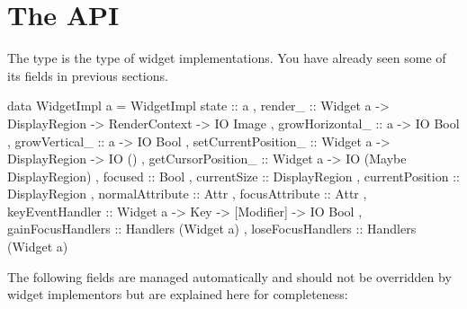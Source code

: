 \section{The  API}

The  type is the type of widget implementations.  You
have already seen some of its fields in previous sections.

\begin{haskellcode}
 data WidgetImpl a = WidgetImpl {
       state :: a
     , render_ :: Widget a -> DisplayRegion -> RenderContext
               -> IO Image
     , growHorizontal_ :: a -> IO Bool
     , growVertical_ :: a -> IO Bool
     , setCurrentPosition_ :: Widget a -> DisplayRegion -> IO ()
     , getCursorPosition_ :: Widget a -> IO (Maybe DisplayRegion)
     , focused :: Bool
     , currentSize :: DisplayRegion
     , currentPosition :: DisplayRegion
     , normalAttribute :: Attr
     , focusAttribute :: Attr
     , keyEventHandler :: Widget a -> Key -> [Modifier] -> IO Bool
     , gainFocusHandlers :: Handlers (Widget a)
     , loseFocusHandlers :: Handlers (Widget a)
     }
\end{haskellcode}

The following fields are managed automatically and should not be
overridden by widget implementors but are explained here for
completeness:

